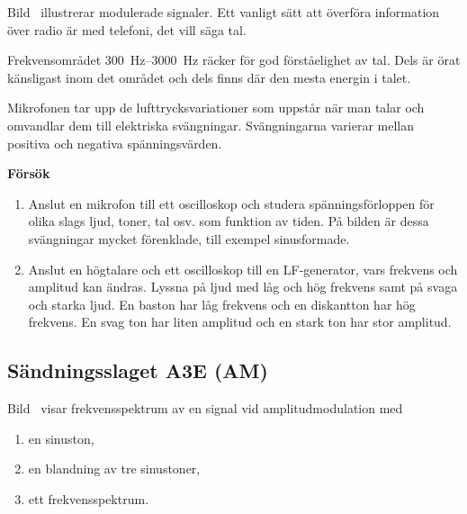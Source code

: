 Bild~ illustrerar modulerade signaler.
Ett vanligt sätt att överföra information över radio är med telefoni, det vill
säga tal.

Frekvensområdet \SIrange{300}{3000}{\hertz} räcker för god förståelighet av tal.
Dels är örat känsligast inom det området och dels finns där den mesta energin
i talet.

Mikrofonen tar upp de lufttrycksvariationer som uppstår när man talar och
omvandlar dem till elektriska svängningar.
Svängningarna varierar mellan positiva och negativa spänningsvärden.

\bigskip

\textbf{Försök}

\begin{enumerate}
\item Anslut en mikrofon till ett oscilloskop och studera spänningsförloppen
  för olika slags ljud, toner, tal osv. som funktion av tiden.
  På bilden är dessa svängningar mycket förenklade, till exempel sinusformade.

\item Anslut en högtalare och ett oscilloskop till en LF-generator, vars
frekvens och amplitud kan ändras. Lyssna på ljud med låg och hög frekvens samt
på svaga och starka ljud.
En baston har låg frekvens och en diskantton har hög frekvens.
En svag ton har liten amplitud och en stark ton har stor amplitud.
\end{enumerate}

\subsection{Sändningsslaget A3E (AM)}
\label{modulation_am}


Bild~ visar frekvensspektrum av en signal vid
amplitudmodulation med

\begin{enumerate}[label=\alph*.,noitemsep]
\item en sinuston,
\item en blandning av tre sinustoner,
\item ett frekvensspektrum.
\end{enumerate}


